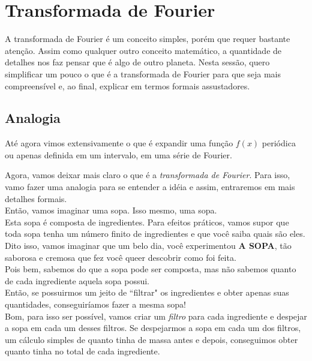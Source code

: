 \chapter{Transformada de Fourier}


A transformada de Fourier é um conceito simples, porém que requer bastante
atenção. Assim como qualquer outro conceito matemático, a quantidade de 
detalhes nos faz pensar que é algo de outro planeta. Nesta sessão, quero
simplificar um pouco o que é a transformada de Fourier para que seja
mais compreensível e, ao final, explicar em termos formais assustadores.


\section{Analogia}
Até agora vimos extensivamente o que é expandir uma função $f(x)$ periódica
ou apenas definida em um intervalo, em uma série de Fourier. 

Agora, vamos deixar mais claro o que é a \textit{transformada de Fourier}.
Para isso, vamo fazer uma analogia para se entender a idéia e assim,
entraremos em mais detalhes formais.\\

Então, vamos imaginar uma sopa. Isso mesmo, uma sopa.\\

Esta sopa é composta de ingredientes. Para efeitos práticos, vamos supor
que toda sopa tenha um número finito de ingredientes e que você saiba 
quais são eles.\\

Dito isso, vamos imaginar que um belo dia, você experimentou \textbf{A SOPA},
tão saborosa e cremosa que fez você queer descobrir como foi feita.\\

Pois bem, sabemos do que a sopa pode ser composta, mas não sabemos quanto de cada
ingrediente aquela sopa possui.\\

Então, se possuirmos um jeito de ``filtrar" os ingredientes e obter apenas 
suas quantidades, conseguiríamos fazer a mesma sopa! \\

Bom, para isso ser possível, vamos criar um \textit{filtro} para cada 
ingrediente e despejar a sopa em cada um desses filtros. Se despejarmos 
a sopa em cada um dos filtros, um cálculo simples de quanto tinha de massa 
antes e depois, conseguimos obter quanto tinha no total de cada ingrediente.\\


